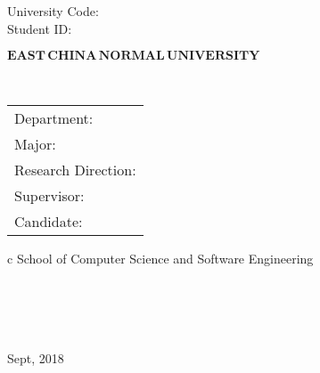 

\pagestyle{empty}

\hskip 1.83cm {\large University Code: \quad}\\
\hspace*{\fill} {\large Student ID: }

\vskip 2cm

\begin{center}
{\Huge $\mathbf{EAST}\,\mathbf{CHINA}\,\mathbf{NORMAL}\,
\mathbf{UNIVERSITY}$}
\end{center}

\vskip 3cm

\begin{center}
\bfseries{\scshape{\huge \TheisNameEn
}}\\
\end{center}

\vskip 2cm {\large
\begin{center}
\begin{tabular}{l}
Department:\\
Major:\\ 
Research Direction:\\
Supervisor:\\
Candidate:
\end{tabular}
\begin{tabular}c
\normalsize{{School of Computer Science and Software Engineering}}\\
\hline ~~~  \\
\hline ~~~\\
\hline ~~~ \\
\hline ~~~  \\
\hline
\end{tabular}
\end{center}}

\vskip 30mm

\begin{center}
{\Large Sept, 2018}
\end{center}
